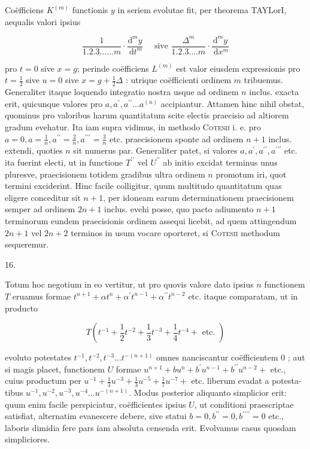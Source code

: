 \documentclass[10pt]{article}
\begin{document}
Coëfficiens \(K^{(m)}\) functionis \(y\) in seriem evolutae fit, per theorema TAYLorI, aequalis valori ipsius

\[
\frac{1}{1.2 .3 \ldots \ldots m} \cdot \frac{\mathrm{d}^{m} y}{\mathrm{~d} t^{m}} \quad \text { sive } \frac{\Delta^{m}}{1.2 .3 \ldots . m} \cdot \frac{\mathrm{d}^{m} y}{\mathrm{~d} x^{m}}
\]

pro \(t=0\) sive \(x=g\); perinde coëfficiens \(L^{(m)}\) est valor eiusdem expressionis pro \(t=\frac{1}{2}\) sive \(u=0\) sive \(x=g+\frac{1}{2} \Delta\) : utrique coëfficienti ordinem \(m\) tribuemus. Generaliter itaque loquendo integratio nostra usque ad ordinem \(n\) inclus. exacta erit, quicunque valores pro \(a, a^{\prime}, a^{\prime \prime} \ldots a^{(n)}\) accipiantur. Attamen hinc nihil obstat, quominus pro valoribus harum quantitatum scite electis praecisio ad altiorem gradum evehatur. Ita iam supra vidimus, in methodo \textsc{Cotesii} i. e. pro \(a=0, a=\frac{1}{n}, a^{\prime \prime}=\frac{2}{n}, a^{\prime \prime \prime}=\frac{3}{n}\) etc. praecisionem sponte ad ordinem \(n+1\) inclus. extendi, quoties \(n\) sit numerus par. Generaliter patet, si valores \(a, a^{\prime}, a^{\prime \prime}, a^{\prime \prime \prime}\) etc. ita fuerint electi, ut in functione \(T^{\prime \prime}\) vel \(U^{\prime \prime}\) ab initio excidat terminus unus pluresve, praecisionem totidem gradibus ultra ordinem \(n\) promotum iri, quot termini exciderint. Hinc facile colligitur, quum multitudo quantitatum quas eligere conceditur sit \(n+1\), per idoneam earum determinationem praecisionem semper ad ordinem \(2 n+1\) inclus. evehi posse, quo pacto adiumento \(n+1\) terminorum eundem praecisionis ordinem assequi licebit, ad quem attingendum \(2 n+1\) vel \(2 n+2\) terminos in usum vocare oporteret, si \textsc{Cotesii} methodum sequeremur.

16.

Totum hoc negotium in eo vertitur, ut pro quovis valore dato ipsius \(n\) functionem \(T\) eruamus formae \(t^{n+1}+\alpha t^{n}+\alpha^{\prime} t^{n-1}+\alpha^{\prime \prime} t^{n-2}\) etc. itaque comparatam, ut in producto

\[
T\left(t^{-1}+\frac{1}{2} t^{-2}+\frac{1}{3} t^{-3}+\frac{1}{4} t^{-4}+\text { etc. }\right)
\]

evoluto potestates \(t^{-1}, t^{-2}, t^{-3} \ldots t^{-(n+1)}\) omnes nanciscantur coëfficientem 0 ; aut si magis placet, functionem \(U\) formae \(u^{n+1}+b u^{n}+b^{\prime} u^{n-1}+b^{\prime \prime} u^{n-2}+\) etc., cuius productum per \(u^{-1}+\frac{1}{3} u^{-3}+\frac{1}{3} u^{-5}+\frac{1}{7} u^{-7}+\) etc. liberum evadat a potesta-
tibus \(u^{-1}, u^{-2}, u^{-3}, u^{-4} \ldots u^{-(n+1)}\). Modus posterior aliquanto simplicior erit: quum enim facile perspiciatur, coëfficientes ipsius \(U\), ut conditioni praescriptae satisfiat, alternatim evanescere debere, sive statui \(b=0, b^{\prime \prime}=0, b^{\prime \prime \prime \prime}=0\) etc., laboris dimidia fere pars iam absoluta censenda erit. Evolvamus casus quosdam simpliciores.
\end{document}
